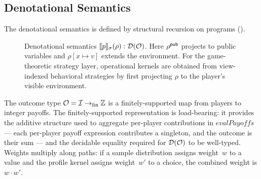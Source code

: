 \documentclass[11pt]{article}
\begin{document}
\subsection{Denotational Semantics}\label{sec:densem}

The denotational semantics is defined by structural recursion on programs
().

\begin{figure}[ht]
\centering
{}
\caption{Denotational semantics $\llbracket p \rrbracket_{\sigma}(\rho) : \mathcal{D}(\mathcal{O})$.
Here $\rho^{\mathsf{pub}}$ projects to public variables and $\rho[x \mapsto v]$
extends the environment. For the game-theoretic strategy layer, operational
kernels are obtained from view-indexed behavioral strategies by first
projecting $\rho$ to the player's visible environment.}\label{fig:outcomedist}
\end{figure}

\noindent
The outcome type $\mathcal{O} = \mathcal{I} \to_{\mathrm{fin}} \mathbb{Z}$ is a
finitely-supported map from players to integer payoffs. The
finitely-supported representation is load-bearing: it provides the additive
structure used to aggregate per-player contributions in $\mathit{evalPayoffs}$
--- each per-player payoff expression contributes a singleton, and the
outcome is their sum --- and the decidable equality required for
$\mathcal{D}(\mathcal{O})$ to be well-typed.
Weights multiply along paths: if a sample distribution assigns weight~$w$ to a
value and the profile kernel assigns weight~$w'$ to a choice, the combined
weight is $w \cdot w'$.
\end{document}
